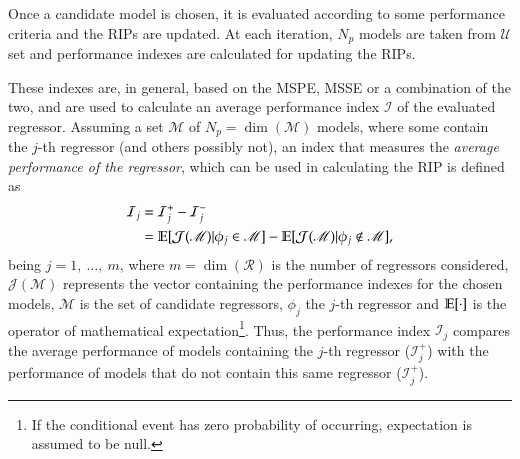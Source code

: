 Once a candidate model is chosen, it is evaluated according to some performance criteria and the RIPs are updated. At each iteration, $N_p$ models are taken from $\mathscr{U}$ set and performance indexes are calculated for updating the RIPs.

These indexes are, in general, based on the MSPE, MSSE or a combination of the two, and are used to calculate an average performance index $\mathcal{I}$ of the evaluated regressor.
Assuming a set $\mathscr{M}$ of $N_p = \dim(\mathscr{M})$ models, where some contain the $j$-th regressor (and others possibly not), an index that measures the \textit{average performance of the regressor}, which can be used in calculating the RIP is defined as
\begin{align}
   \mathcal{I}_j &= \mathcal{I}_j^+ - \mathcal{I}_j^- \nonumber\\
      &= \mathbb{E}[\mathcal{J}(\mathscr{M})|\phi_j \in \mathscr{M}] - \mathbb{E}[\mathcal{J}(\mathscr{M})|\phi_j \notin \mathscr{M}],
\label{eq:desMedioReg}
\end{align}
being $j = 1,\ \dots,\ m$, where $m = \dim{(\mathscr{R})}$ is the number of regressors considered, $\mathcal{J}(\mathscr{M})$ represents the vector containing the performance indexes for the chosen models, $\mathscr{M}$ is the set of candidate regressors, $\phi_j$ the $j$-th regressor and $\mathbb{E}[\cdot]$ is the operator of mathematical expectation\footnote{If the conditional event has zero probability of occurring, expectation is assumed to be null.}. Thus, the performance index $\mathcal{I}_j$ compares the average performance of models containing the $j$-th regressor ($ \mathcal{I}_j^+$) with the performance of models that do not contain this same regressor ($ \mathcal{I}_j^+$).
